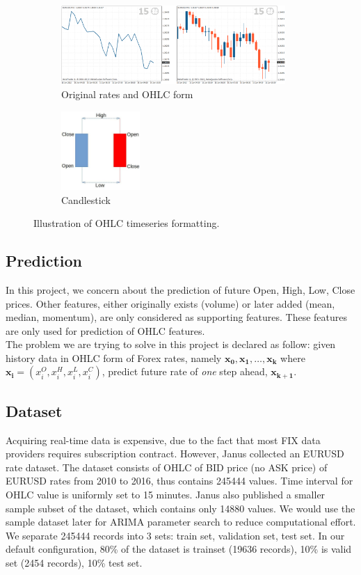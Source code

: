 \documentclass[11pt]{article}
\begin{document}
\begin{figure}
    \begin{subfigure}[b]{0.5\textwidth}
      \includegraphics[height=3cm]{figs/ohlc.png}
      \caption{Original rates and OHLC form}
    \end{subfigure}
    \quad\quad\quad\quad\quad\quad\quad
    \begin{subfigure}[b]{0.2\textwidth}
      \includegraphics[height=3cm]{figs/candle.png}
      \caption{Candlestick}
    \end{subfigure}
    \caption{Illustration of OHLC timeseries formatting.}
\end{figure}

\subsection{Prediction}
In this project, we concern about the prediction of future Open, High, Low,
Close prices. Other features, either originally exists (volume) or later added
(mean, median, momentum), are only considered as supporting features. These
features are only used for prediction of OHLC features.\\
The problem we are trying to solve in this project is declared as follow: given
history data in OHLC form of Forex rates, namely $\mathbf{x_0},
\mathbf{x_1},\ldots,\mathbf{x_k}$ where $\mathbf{x_i}=(x^O_i, x^H_i, x^L_i, x^C_i )$,
predict future rate of \textit{one} step ahead, $\mathbf{x_{k+1}}$. 

\subsection{Dataset}
Acquiring real-time data is expensive, due to the fact that most FIX data
providers requires subscription contract. However, Janus \cite{meehau16eurusd}
collected an EURUSD rate dataset. The dataset consists of OHLC of BID price (no
ASK price) of EURUSD rates from 2010 to 2016, thus contains 245444 values. Time
interval for OHLC value is uniformly set to 15 minutes. Janus also published a
smaller sample subset of the dataset, which contains only 14880 values. We would
use the sample dataset later for ARIMA parameter search to reduce computational
effort.\\
We separate 245444 records into 3 sets: train set, validation set, test set. In
our default configuration, 80\% of the dataset is trainset (19636 records), 10\%
is valid set (2454 records), 10\% test set.\\
\end{document}
